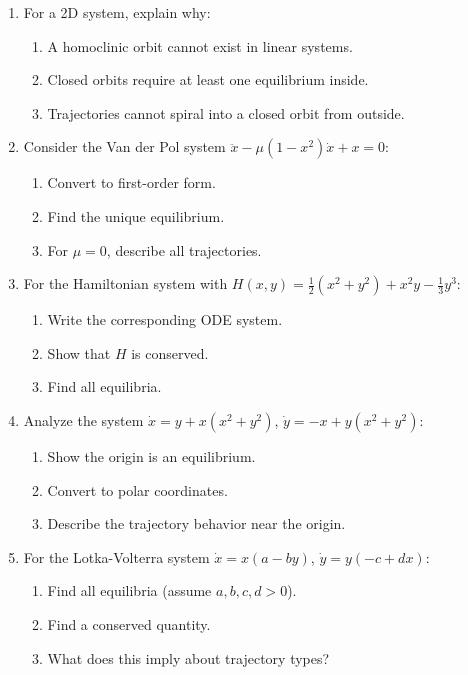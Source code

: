 \documentclass[12pt]{article}
\begin{document}
\begin{enumerate}[resume]
\item For a 2D system, explain why:
\begin{enumerate}[label=(\alph*)]
    \item A homoclinic orbit cannot exist in linear systems.
    \item Closed orbits require at least one equilibrium inside.
    \item Trajectories cannot spiral into a closed orbit from outside.
\end{enumerate}

\item Consider the Van der Pol system $\ddot{x} - \mu(1-x^2)\dot{x} + x = 0$:
\begin{enumerate}[label=(\alph*)]
    \item Convert to first-order form.
    \item Find the unique equilibrium.
    \item For $\mu = 0$, describe all trajectories.
\end{enumerate}

\item For the Hamiltonian system with $H(x,y) = \frac{1}{2}(x^2 + y^2) + x^2y - \frac{1}{3}y^3$:
\begin{enumerate}[label=(\alph*)]
    \item Write the corresponding ODE system.
    \item Show that $H$ is conserved.
    \item Find all equilibria.
\end{enumerate}

\item Analyze the system $\dot{x} = y + x(x^2 + y^2)$, $\dot{y} = -x + y(x^2 + y^2)$:
\begin{enumerate}[label=(\alph*)]
    \item Show the origin is an equilibrium.
    \item Convert to polar coordinates.
    \item Describe the trajectory behavior near the origin.
\end{enumerate}

\item For the Lotka-Volterra system $\dot{x} = x(a - by)$, $\dot{y} = y(-c + dx)$:
\begin{enumerate}[label=(\alph*)]
    \item Find all equilibria (assume $a,b,c,d > 0$).
    \item Find a conserved quantity.
    \item What does this imply about trajectory types?
\end{enumerate}
\end{enumerate}
\end{document}

